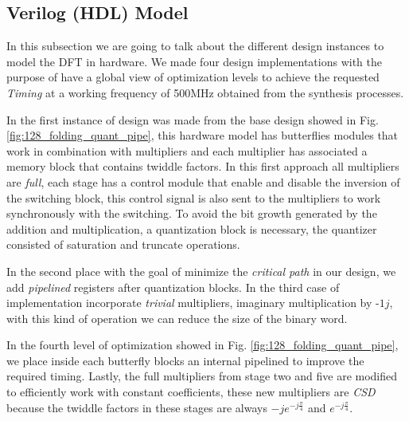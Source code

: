 \documentclass[journal,comsoc]{IEEEtran}
\begin{document}
\subsection{Verilog (HDL) Model} 

In this subsection we are going to talk about the different design instances to model the DFT in hardware. 
We made four design implementations with the purpose of have a global view of optimization levels to achieve the requested \textit{Timing} at a working frequency of 500MHz obtained from the synthesis processes.

In the first instance of design was made from the base design showed in Fig. \ref{fig:128_folding_quant_pipe}, this hardware model has butterflies modules that work in combination with multipliers and each multiplier has associated a memory block that contains twiddle factors. In this first approach all multipliers are \textit{full}, each stage has a control module that enable and disable the inversion of the switching block, this control signal is also sent to the multipliers to work synchronously with the switching. To avoid the bit growth generated by the addition and multiplication, a quantization block is necessary, the quantizer consisted of saturation and truncate operations.

In the second place with the goal of minimize the \textit{critical path} in our design, we add \textit{pipelined} registers after quantization blocks. In the third case of implementation incorporate \textit{trivial} multipliers, imaginary multiplication by -$1j$, with this kind of operation we can reduce the size of the binary word. 

In the fourth level of optimization showed in Fig. \ref{fig:128_folding_quant_pipe}, we place inside each butterfly blocks an internal pipelined to improve the required timing. Lastly, the full multipliers from stage two and five are modified to efficiently work with constant coefficients, these new multipliers are \textit{CSD} because the twiddle factors in these stages are always $-je^{-j\frac{\pi}{4}}$ and $e^{-j\frac{\pi}{4}}$.


 
\end{document}
